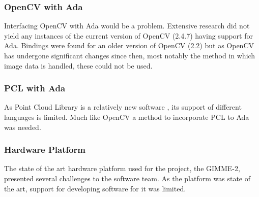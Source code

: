 \subsubsection{OpenCV with Ada}
Interfacing OpenCV with Ada would be a problem. Extensive research did not yield any instances of the current version of OpenCV (2.4.7) having support for Ada. Bindings were found for an older version of OpenCV (2.2) \cite{web:oldAdaBindings} but as OpenCV has undergone significant changes since then, most notably the method in which image data is handled, these could not be used.

\subsubsection{PCL with Ada}
As Point Cloud Library is a relatively new software \cite{Rusu_ICRA2011_PCL}, its support of different languages is limited. Much like OpenCV a method to incorporate PCL to Ada was needed.

\subsubsection{Hardware Platform}
The state of the art hardware platform used for the project, the GIMME-2, presented several challenges to the software team. As the platform was state of the art, support for developing software for it was limited.
